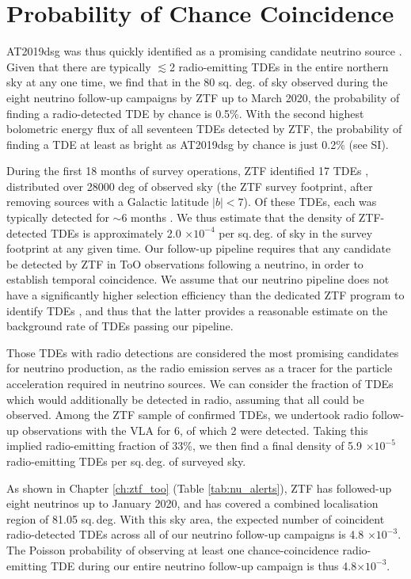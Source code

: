 \section{Probability of Chance Coincidence}

AT2019dsg was thus quickly identified as a promising candidate neutrino source \cite{2019ATel13160....1S}. Given that there are typically $\lesssim$2 radio-emitting TDEs in the entire northern sky at any one time, we find that in the 80 sq. deg. of sky observed during the eight neutrino follow-up campaigns by ZTF up to March 2020, the probability of finding a radio-detected TDE by chance is 0.5\%. With the second highest bolometric energy flux of all seventeen TDEs detected by ZTF, the probability of finding a TDE at least as bright as AT2019dsg by chance is just 0.2\% (see SI).

During the first 18 months of survey operations, ZTF identified 17 TDEs \cite{2020arXiv200101409V}, distributed over 28000 deg of observed sky (the ZTF survey footprint, after removing sources with a Galactic latitude $|b|<7$). Of these TDEs, each was typically detected for $\sim$6 months \cite{2020arXiv200101409V}. We thus estimate that the density of ZTF-detected TDEs is approximately 2.0 $\times 10^{-4}$ per sq.\,deg. of sky in the survey footprint at any given time. Our follow-up pipeline requires that any candidate be detected by ZTF in ToO observations following a neutrino, in order to establish temporal coincidence. We assume that our neutrino pipeline does not have a significantly higher selection efficiency than the dedicated ZTF program to identify TDEs \cite{2020arXiv200101409V}, and thus that the latter provides a reasonable estimate on the background rate of TDEs passing our pipeline.

Those TDEs with radio detections are considered the most promising candidates for neutrino production, as the radio emission serves as a tracer for the particle acceleration required in neutrino sources. We can consider the fraction of TDEs which would additionally be detected in radio, assuming that all could be observed. Among the ZTF sample of confirmed TDEs, we undertook radio follow-up observations with the VLA for 6, of which 2 were detected. Taking this implied radio-emitting fraction of 33\%, we then find a final density of 5.9 $\times 10^{-5}$ radio-emitting TDEs per sq.\,deg. of surveyed sky. 

As shown in Chapter \ref{ch:ztf_too} (Table \ref{tab:nu_alerts}), ZTF has followed-up eight neutrinos up to January 2020, and has covered a combined localisation region of 81.05 sq.\,deg. With this sky area, the expected number of coincident radio-detected TDEs across all of our neutrino follow-up campaigns is 4.8 $\times 10^{-3}$. The Poisson probability of observing at least one chance-coincidence radio-emitting TDE during our entire neutrino follow-up campaign is thus 4.8$ \times 10^{-3}$. 

